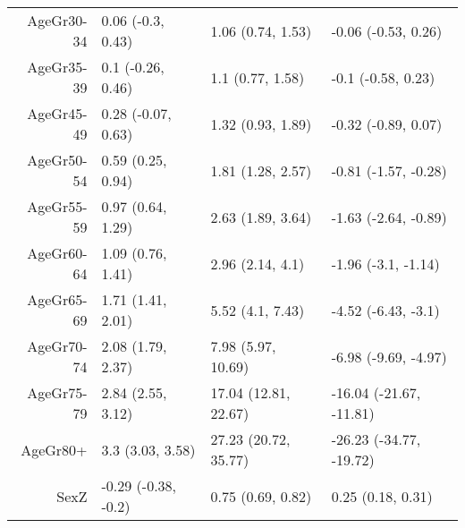\begin{table}[ht]
\begin{tabular}{rlll}
  AgeGr30-34 & 0.06 (-0.3, 0.43) & 1.06 (0.74, 1.53) & -0.06 (-0.53, 0.26) \\ 
  AgeGr35-39 & 0.1 (-0.26, 0.46) & 1.1 (0.77, 1.58) & -0.1 (-0.58, 0.23) \\ 
  AgeGr45-49 & 0.28 (-0.07, 0.63) & 1.32 (0.93, 1.89) & -0.32 (-0.89, 0.07) \\ 
  AgeGr50-54 & 0.59 (0.25, 0.94) & 1.81 (1.28, 2.57) & -0.81 (-1.57, -0.28) \\ 
  AgeGr55-59 & 0.97 (0.64, 1.29) & 2.63 (1.89, 3.64) & -1.63 (-2.64, -0.89) \\ 
  AgeGr60-64 & 1.09 (0.76, 1.41) & 2.96 (2.14, 4.1) & -1.96 (-3.1, -1.14) \\ 
  AgeGr65-69 & 1.71 (1.41, 2.01) & 5.52 (4.1, 7.43) & -4.52 (-6.43, -3.1) \\ 
  AgeGr70-74 & 2.08 (1.79, 2.37) & 7.98 (5.97, 10.69) & -6.98 (-9.69, -4.97) \\ 
  AgeGr75-79 & 2.84 (2.55, 3.12) & 17.04 (12.81, 22.67) & -16.04 (-21.67, -11.81) \\ 
  AgeGr80+ & 3.3 (3.03, 3.58) & 27.23 (20.72, 35.77) & -26.23 (-34.77, -19.72) \\ 
  SexZ & -0.29 (-0.38, -0.2) & 0.75 (0.69, 0.82) & 0.25 (0.18, 0.31) \\ 
   \hline
\end{tabular}
\end{table}
